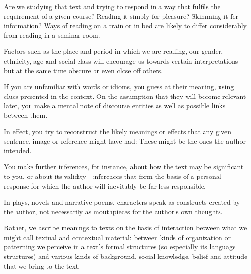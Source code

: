 \begin{listmatch}
	\item
 Are we studying that text and trying to respond in a
way that fulfils the requirement of a given course? Reading it simply
for pleasure? Skimming it for information? Ways of reading on a train or
in bed are likely to differ considerably from reading in a seminar
room.

\item 
Factors such as the place and period in which we are
reading, our gender, ethnicity, age and social class will encourage us
towards certain interpretations but at the same time obscure or even
close off others.

\item 
 If you are unfamiliar with words or idioms, you guess
at their meaning, using clues presented in the context. On the
assumption that they will become relevant later, you make a mental note
of discourse entities as well as possible links between them.


\item 
In effect, you try to reconstruct the likely meanings or
effects that any given sentence, image or reference might have had:
These might be the ones the author intended.


\item 
You make further inferences, for instance, about how the
text may be significant to you, or about its validity---inferences that
form the basis of a personal response for which the author will
inevitably be far less responsible.

\item 
In plays, novels and narrative poems, characters speak
as constructs created by the author, not necessarily as mouthpieces for
the author's own thoughts.


\item 
Rather, we ascribe meanings to texts on the basis of
interaction between what we might call textual and contextual material:
between kinds of organization or patterning we perceive in a text's
formal structures (so especially its language structures) and various
kinds of background, social knowledge, belief and attitude that we bring
to the text.

\end{listmatch}


